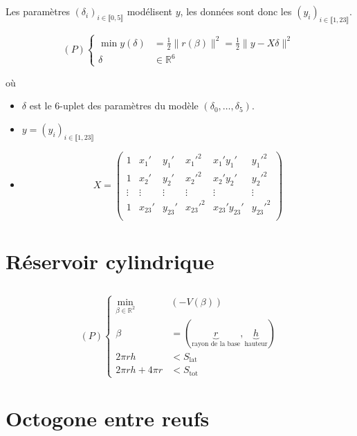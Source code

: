 \documentclass{article}
\begin{document}
\subsection{}

Les paramètres $(\delta_i)_{i\in \llbracket 0, 5 \rrbracket}$ modélisent $y$, les données sont donc les $(y_i)_{i\in \llbracket 1, 23 \rrbracket}$.

\[
	(P) \begin{cases}
		\min y(\delta) &= \frac{1}{2} \|r(\beta)\|^2 = \frac{1}{2} \|y-X\delta\|^2 \\
		\delta &\in \mathbb{R}^6
	\end{cases}
\] 

où

\begin{itemize}
	\item $\delta$ est le 6-uplet des paramètres du modèle $(\delta_0, \ldots, \delta_5)$.
	\item $y = (y_i)_{i\in \llbracket 1, 23 \rrbracket}$
	\item \[
			X = \begin{pmatrix}
				1 & x_1' & y_1' & x_1'^2 & x_1' y_1' & y_1'^2 \\
				1 & x_2' & y_2' & x_2'^2 & x_2' y_2' & y_2'^2 \\
				\vdots & \vdots & \vdots & \vdots & \vdots & \vdots \\
				1 & x_{23}' & y_{23}' & x_{23}'^2 & x_{23}' y_{23}' & y_{23}'^2 \\
			\end{pmatrix} 
	\] 
\end{itemize}

\section{Réservoir cylindrique}

\subsection{}

\[
	(P) \begin{cases}
		\min_{\beta\in \mathbb{R}^2}& (-V(\beta)) \\
		\beta &= (\underbrace{r}_\text{rayon de la base}, \underbrace{h}_\text{hauteur}) \\
		2\pi r h &< S_{\text{lat}} \\
		2\pi r h + 4 \pi r &< S_\text{tot}
	\end{cases}
\] 
\section{Octogone entre reufs}
\end{document}
